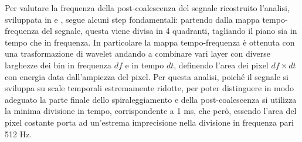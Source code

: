 
Per valutare la frequenza della post-coalescenza del segnale ricostruito l'analisi, sviluppata in \cite{Puecher_2018} e \cite{Tringali_2017}, segue alcuni step fondamentali: partendo dalla mappa tempo-frequenza del segnale, questa viene divisa in 4 quadranti, tagliando il piano sia in tempo che in frequenza. In particolare la mappa tempo-frequenza è ottenuta con una trasformazione di wavelet andando a combinare vari layer con diverse larghezze dei bin in frequenza $df$ e in tempo $dt$, definendo l'area dei pixel $df\times dt$ con energia data dall'ampiezza del pixel. Per questa analisi, poiché il segnale si sviluppa su scale temporali estremamente ridotte, per poter distinguere in modo adeguato la parte finale dello spiraleggiamento e della post-coalescenza si utilizza la minima divisione in tempo, corrispondente a 1 ms, che però, essendo l'area del pixel costante porta ad un'estrema imprecisione nella divisione in frequenza pari 512 Hz.

